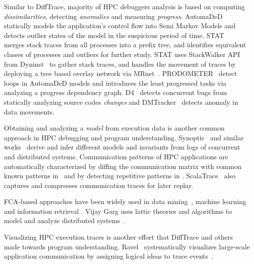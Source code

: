 

Similar to DiffTrace, majority of HPC debuggers analysis is based on computing  \textit{dissimilarities}, detecting \textit{anomalies} and measuring \textit{progress}.
%
AutomaDeD~\cite{automaded-GBron}\cite{automaded-laguna} statically models the application's control flow into Semi Markov Models and detects outlier states of the model in the suspicious period of time.
%
STAT~\cite{stat} merges stack traces from all processes into a prefix tree, and identifies equivalent classes of processes and outliers for further study.
%
STAT uses StackWalker API from Dyninst~\cite{dyninst} to gather stack traces, and handles the movement of traces by deploying a tree based overlay network via MRnet~\cite{mrnet}.
%
PRODOMETER~\cite{prodometer} detect loops in AutomaDeD models and introduces the least progressed tasks via analyzing a progress dependency graph.
%
D4~\cite{liu-18} detects concurrent bugs from statically analyzing source codes \textit{changes} and DMTracker~\cite{dmtracker} detects anomaly in data movements.

Obtaining and analyzing a \textit{model} from execution data is another common approach in HPC debugging and program understanding. 
Synoptic~\cite{beschastnikh-synoptic} and similar works~\cite{beschastnikh-pologs}\cite{beschastnikh-csight} derive and infer different models and invariants from logs of concurrent and distributed systems.
%
Communication patterns of HPC applications are automatically characterized by diffing the communication matrix with common known patterns in~\cite{roth-15} and by detecting repetitive patterns in \cite{preissl-08}.
%
ScalaTrace~\cite{scalatrace} also captures and compresses communication traces for later replay. 
%

FCA-based approaches have been widely used  in data mining~\cite{cldm}, machine learning~\cite{clml} and information retrieval \cite{ignatov17}. Vijay Garg uses lattic theories and algorithms to model and analyze distributed systems~\cite{latticeForDistConst}\cite{garg_2015}.

Visualizing HPC execution traces is another effort that DiffTrace and others made towards program understanding. Ravel~\cite{ravel} systematically visualizes large-scale application communication by assigning logical ideas to trace events~\cite{charmVis}. 







